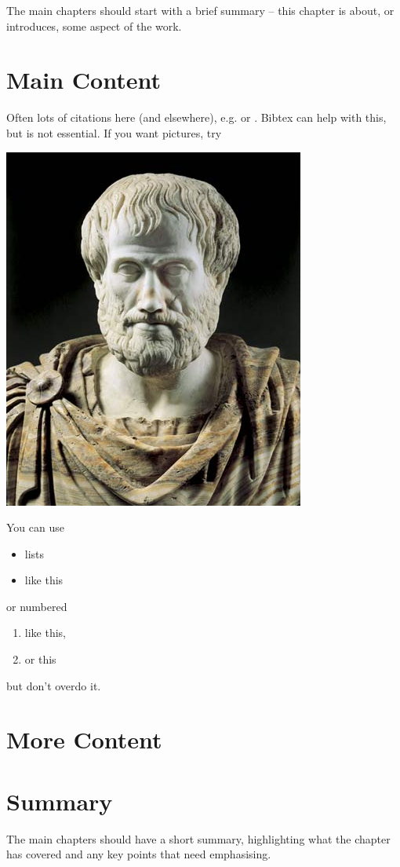 The main chapters should start with a brief summary -- this chapter is about, or introduces, some aspect of the work.

\section{Main Content}
Often lots of citations here (and elsewhere), e.g. \cite{Rey:D} or \cite[Theorem 2.3]{PriorNOP70}.   Bibtex can help with this, but is not essential. If you want pictures, try

\begin{center}
\includegraphics[scale=.5]{aristotle.jpg}
\end{center}
You can use 
\begin{itemize}
\item lists
\item like this
\end{itemize}
or numbered
\begin{enumerate}
\item like this,
\item or this
\end{enumerate}
but don't overdo it.

\section{More Content}

\section{Summary}
The main chapters should have a short summary, highlighting what the chapter has covered and any key points that need emphasising.

